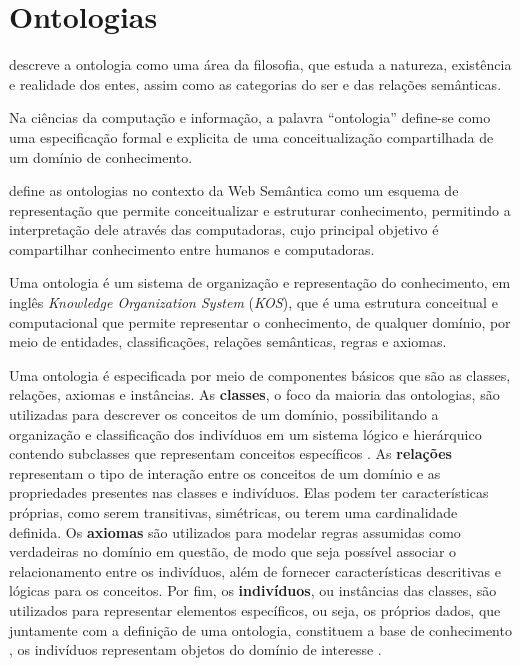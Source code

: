 \section{Ontologias}

\citet{Smith2007} descreve a ontologia como uma área da filosofia,
que estuda a natureza, existência e realidade dos entes, assim como
as categorias do ser e das relações semânticas.

Na ciências da computação e informação, a palavra ``ontologia''
define-se como uma especificação formal e explicita de uma conceitualização
compartilhada de um domínio de conhecimento.

\citet{allemang2011semantic} define as ontologias no contexto da
Web Semântica como um esquema de representação que permite conceitualizar
e estruturar conhecimento, permitindo a interpretação dele através
das computadoras, cujo principal objetivo é compartilhar conhecimento
entre humanos e computadoras.

Uma ontologia é um sistema de organização e representação do conhecimento,
em inglês\emph{ }\foreignlanguage{english}{\emph{Knowledge Organization
System}} (\foreignlanguage{english}{\emph{KOS}}), que é uma estrutura
conceitual e computacional que permite representar o conhecimento,
de qualquer domínio, por meio de entidades, classificações, relações
semânticas, regras e axiomas.

Uma ontologia é especificada por meio de componentes básicos que são
as classes, relações, axiomas e instâncias. As \textbf{classes}, o
foco da maioria das ontologias, são utilizadas para descrever os conceitos
de um domínio, possibilitando a organização e classificação dos indivíduos
em um sistema lógico e hierárquico contendo subclasses que representam
conceitos específicos \citet{noy2001ontology}. As \textbf{relações}
representam o tipo de interação entre os conceitos de um domínio e
as propriedades presentes nas classes e indivíduos. Elas podem ter
características próprias, como serem transitivas, simétricas, ou terem
uma cardinalidade definida. Os \textbf{axiomas} são utilizados para
modelar regras assumidas como verdadeiras no domínio em questão, de
modo que seja possível associar o relacionamento entre os indivíduos,
além de fornecer características descritivas e lógicas para os conceitos.
Por fim, os \textbf{indivíduos}, ou instâncias das classes, são utilizados
para representar elementos específicos, ou seja, os próprios dados,
que juntamente com a definição de uma ontologia, constituem a base
de conhecimento \citep{noy2001ontology}, os indivíduos representam
objetos do domínio de interesse \citet{horridge2011owl}.

